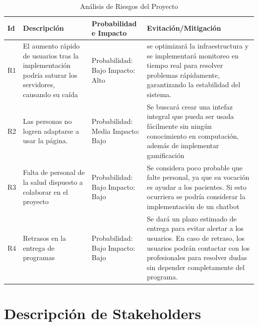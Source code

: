 \documentclass{article}
\begin{document}
	\begin{table}[H]
	\centering
	\caption{Análisis de Riesgos del Proyecto}
	\begin{tabular}{@{} p{1cm} p{5.5cm} p{3cm} p{5.5cm} @{}}
		\toprule
		\textbf{Id} & \textbf{Descripción} & \textbf{Probabilidad e Impacto} & \textbf{Evitación/Mitigación} \\
		\midrule
		
		R1 & 
		El aumento rápido de usuarios tras la implementación podría saturar los servidores, causando su caída & 
		Probabilidad: Bajo \newline Impacto: Alto & 
		se optimizará la infraestructura y se implementará monitoreo en tiempo real para resolver problemas rápidamente, garantizando la estabilidad del sistema. \\
		
		\addlinespace
		
		R2 & 
		Las personas no logren adaptarse a usar la página. & 
		Probabilidad: Media \newline Impacto: Bajo & 
		Se buscará crear una intefaz integral que pueda ser usada fácilmente sin ningún conocimiento en computación, además de implementar gamificación \\
		
		\addlinespace
		
		R3 & 
		Falta de personal de la salud dispuesto a colaborar en el proyecto & 
		Probabilidad: Bajo \newline Impacto: Bajo & 
		Se considera poco probable que falte personal, ya que su vocación es ayudar a los pacientes. Si esto ocurriera se podría considerar la implementación de un chatbot \\
		
		\addlinespace
		
		R4 & 
		Retrasos en la entrega de programas & 
		Probabilidad: Bajo \newline Impacto: Bajo & 
		Se dará un plazo estimado de entrega para evitar alertar a los usuarios. En caso de retraso, los usuarios podrán contactar con los profesionales para resolver dudas sin depender completamente del programa. \\
		
		\bottomrule
	\end{tabular}
	\end{table}
	
	
	
	
	
	\section{Descripción de Stakeholders}
	
\end{document}
